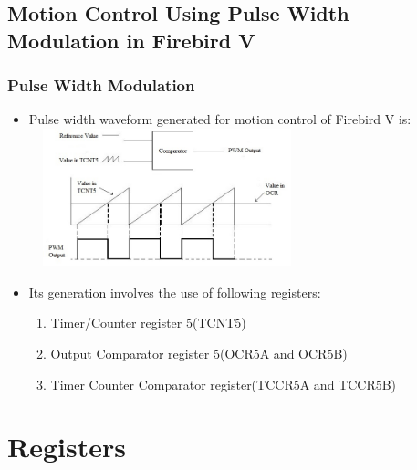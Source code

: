 \documentclass[table,10pt,red]{beamer}	%
\begin{document}
\subsection{Motion Control Using Pulse Width Modulation in Firebird V}
\begin{frame}
	\frametitle{Pulse Width Modulation} 
 		\begin{itemize}
 	    \item Pulse width waveform generated for motion control of Firebird V is:
 	    \pause
 	    \centering
 	    \includegraphics[height=4cm, width=8cm]{PWM}
 	    \end{itemize}
 	    \pause
 		\vfill
 		\begin{itemize}
 	    \item Its generation involves the use of following registers:
 		\pause	 
 		\begin{enumerate} [$\checkmark$]
 			\item <+-|alert@+> Timer/Counter register 5(TCNT5)
 			\item <+-|alert@+> Output Comparator register 5(OCR5A and OCR5B)
 			\item <+-|alert@+> Timer Counter Comparator register(TCCR5A and TCCR5B)
 		\end{enumerate}	
 		\end{itemize}
\end{frame}


\section{Registers}
\end{document}
